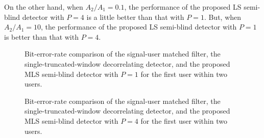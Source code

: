 \documentclass[a4paper,11pt,fleqn]{article}
\begin{document}
On the other hand, when $A_2/A_1=0.1$, the performance of the
proposed LS semi-blind detector with $P=4$ is a little better than
that with $P=1$. But, when $A_2/A_1=10$, the performance of the
proposed LS semi-blind detector with $P=1$ is better than that
with $P=4$.

\begin{figure}
\caption{Bit-error-rate comparison of the signal-user matched
filter, the single-truncated-window decorrelating detector, and
the proposed MLS semi-blind detector with $P=1$ for the first user
within two users.} \label{MLS11}
\end{figure}


\begin{figure}
\caption{Bit-error-rate comparison of the signal-user matched
filter, the single-truncated-window decorrelating detector, and
the proposed MLS semi-blind detector with $P=4$ for the first user
within two users.} \label{MLS41}
\end{figure}
\end{document}
